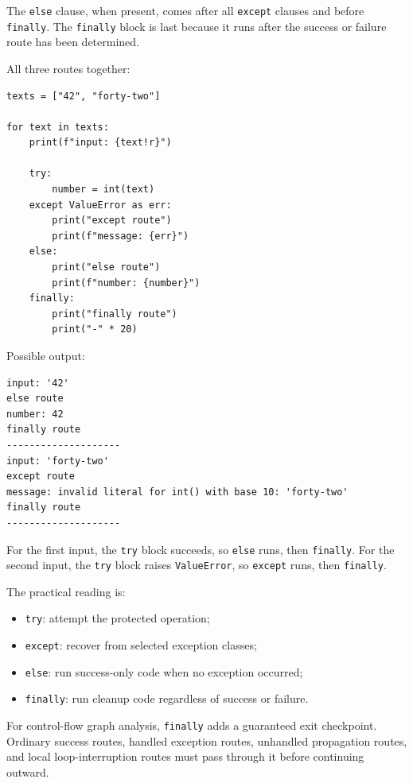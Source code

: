 The \texttt{else} clause, when present, comes after all \texttt{except} clauses and before \texttt{finally}. The \texttt{finally} block is last because it runs after the success or failure route has been determined.

All three routes together:

\begin{verbatim}
texts = ["42", "forty-two"]

for text in texts:
    print(f"input: {text!r}")

    try:
        number = int(text)
    except ValueError as err:
        print("except route")
        print(f"message: {err}")
    else:
        print("else route")
        print(f"number: {number}")
    finally:
        print("finally route")
        print("-" * 20)
\end{verbatim}

Possible output:

\begin{verbatim}
input: '42'
else route
number: 42
finally route
--------------------
input: 'forty-two'
except route
message: invalid literal for int() with base 10: 'forty-two'
finally route
--------------------
\end{verbatim}

For the first input, the \texttt{try} block succeeds, so \texttt{else} runs, then \texttt{finally}. For the second input, the \texttt{try} block raises \texttt{ValueError}, so \texttt{except} runs, then \texttt{finally}.

The practical reading is:

\begin{itemize}
    \item \texttt{try}: attempt the protected operation;
    \item \texttt{except}: recover from selected exception classes;
    \item \texttt{else}: run success-only code when no exception occurred;
    \item \texttt{finally}: run cleanup code regardless of success or failure.
\end{itemize}

For control-flow graph analysis, \texttt{finally} adds a guaranteed exit checkpoint. Ordinary success routes, handled exception routes, unhandled propagation routes, and local loop-interruption routes must pass through it before continuing outward.